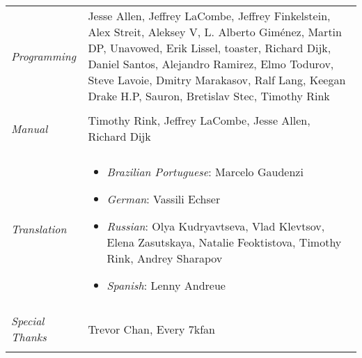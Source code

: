 \begin{tabular}{p{1in} p{3in}}
	\textit{Programming} & Jesse Allen, Jeffrey LaCombe, Jeffrey Finkelstein, Alex Streit, Aleksey V, L. Alberto Giménez, Martin DP, Unavowed, Erik Lissel, toaster, Richard Dijk, Daniel Santos, Alejandro Ramirez, Elmo Todurov, Steve Lavoie, Dmitry Marakasov, Ralf Lang, Keegan Drake H.P, Sauron, Bretislav Stec, Timothy Rink \\ \\
	\textit{Manual} & Timothy Rink, Jeffrey LaCombe, Jesse Allen, Richard Dijk \\ \\
	\textit{Translation} & 
		\begin{itemize}
			\item \textit{Brazilian Portuguese}: Marcelo Gaudenzi
			\item \textit{German}: Vassili Echser
			\item \textit{Russian}: Olya Kudryavtseva, Vlad Klevtsov, Elena Zasutskaya, Natalie Feoktistova, Timothy Rink, Andrey Sharapov
			\item \textit{Spanish}: Lenny Andreue
		\end{itemize} \\ \\
	\textit{Special Thanks} & Trevor Chan, Every 7kfan \\ \\
\end{tabular}